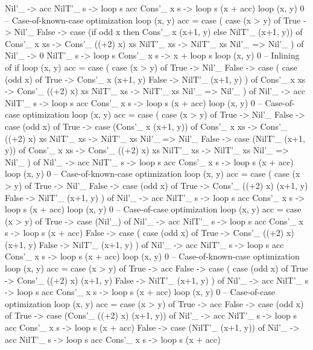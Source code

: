 \begin{spec}
  Nil'_ -> acc
  NilT'_ s -> loop s acc
  Cons'_ x s -> loop s (x + acc)
loop (x, y) 0
-- Case-of-known-case optimization
loop (x, y) acc = case (
  case (x > y) of
    True -> Nil'_
    False -> case (if odd x then Cons'_ x (x+1, y) else NilT'_ (x+1, y)) of
      Cons'_ x xs -> Cons'_ ((+2) x) xs
      NilT'_ xs -> NilT'_ xs
      Nil'_ => Nil'_
) of
  Nil'_ -> 0
  NilT'_ s -> loop s
  Cons'_ x s -> x + loop s
loop (x, y) 0
-- Inlining of if
loop (x, y) acc = case (
  case (x > y) of
    True -> Nil'_
    False -> case (
      case (odd x) of
        True -> Cons'_ x (x+1, y) 
        False -> NilT'_ (x+1, y)
    ) of
      Cons'_ x xs -> Cons'_ ((+2) x) xs
      NilT'_ xs -> NilT'_ xs
      Nil'_ => Nil'_
) of
  Nil'_ -> acc
  NilT'_ s -> loop s acc
  Cons'_ x s -> loop s (x + acc)
loop (x, y) 0
-- Case-of-case optimization
loop (x, y) acc = case (
  case (x > y) of
    True -> Nil'_
    False ->  case (odd x) of
      True -> case (Cons'_ x (x+1, y)) of
    Cons'_ x xs -> Cons'_ ((+2) x) xs
    NilT'_ xs -> NilT'_ xs
    Nil'_ => Nil'_
      False -> case (NilT'_ (x+1, y)) of
        Cons'_ x xs -> Cons'_ ((+2) x) xs
        NilT'_ xs -> NilT'_ xs
        Nil'_ => Nil'_
) of
  Nil'_ -> acc
  NilT'_ s -> loop s acc
  Cons'_ x s -> loop s (x + acc)
loop (x, y) 0
-- Case-of-known-case optimization
loop (x, y) acc = case (
  case (x > y) of
    True -> Nil'_
    False ->  case (odd x) of
      True -> Cons'_ ((+2) x) (x+1, y)
      False -> NilT'_ (x+1, y)
  ) of
    Nil'_ -> acc
    NilT'_ s -> loop s acc
    Cons'_ x s -> loop s (x + acc)
loop (x, y) 0
-- Case-of-case optimization
loop (x, y) acc = case (x > y) of
  True -> case (Nil'_) of
    Nil'_ -> acc
    NilT'_ s -> loop s acc
    Cons'_ x s -> loop s (x + acc)
  False -> case (
    case (odd x) of
      True -> Cons'_ ((+2) x) (x+1, y)
      False -> NilT'_ (x+1, y)
  ) of
    Nil'_ -> acc
    NilT'_ s -> loop s acc
    Cons'_ x s -> loop s (x + acc)
loop (x, y) 0
-- Case-of-known-case optimization
loop (x, y) acc = case (x > y) of
  True -> acc
  False -> case (
    case (odd x) of
      True -> Cons'_ ((+2) x) (x+1, y)
      False -> NilT'_ (x+1, y)
  ) of
    Nil'_ -> acc
    NilT'_ s -> loop s acc
    Cons'_ x s -> loop s (x + acc)
loop (x, y) 0
-- Case-of-case optimization
loop (x, y) acc = case (x > y) of
  True -> acc
  False -> case (odd x) of
    True -> case (Cons'_ ((+2) x) (x+1, y)) of
      Nil'_ -> acc
      NilT'_ s -> loop s acc
      Cons'_ x s -> loop s (x + acc)
    False -> case (NilT'_ (x+1, y)) of
      Nil'_ -> acc
      NilT'_ s -> loop s acc
      Cons'_ x s -> loop s (x + acc)

\end{spec}
